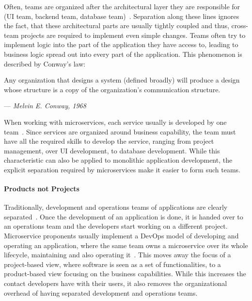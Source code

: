 Often, teams are organized after the architectural layer they are responsible for (\ac{UI} team, backend team, database team)~\cite{Kim2016, Lewis2014}.
Separation along these lines ignores the fact, that these architectural parts are usually tightly coupled and thus, cross-team projects are required to implement even simple changes.
Teams often try to implement logic into the part of the application they have access to, leading to business logic spread out into every part of the application.
This phenomenon is described by Conway's law:

\begin{displayquote}
    Any organization that designs a system (defined broadly) will produce a design whose structure is a copy of the organization's communication structure.
    \begin{flushright}
        --- \textit{Melvin E. Conway, 1968~\cite{Conway1968}}
    \end{flushright}
\end{displayquote}

When working with microservices, each service usually is developed by one team~\cite{Baresi2020, Mazzara2020, Lewis2014}.
Since services are organized around business capability, the team must have all the required skills to develop the service, ranging from project management, over \ac{UI} development, to database development.
While this characteristic can also be applied to monolithic application development, the explicit separation required by microservices make it easier to form such teams.

\paragraph{Products not Projects}

Traditionally, development and operations teams of applications are clearly separated~\cite{Kim2016}.
Once the development of an application is done, it is handed over to an operations team and the developers start working on a different project.
Microservice proponents usually implement a DevOps model of developing and operating an application, where the same team owns a microservice over its whole lifecycle, maintaining and also operating it~\cite{Lewis2014}.
This moves away the focus of a project-based view, where software is seen as a set of functionalities, to a product-based view focusing on the business capabilities.
While this increases the contact developers have with their users, it also removes the organizational overhead of having separated development and operations teams.

